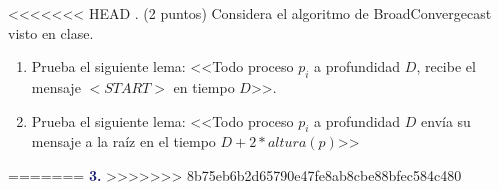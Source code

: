 <<<<<<< HEAD
. (2 puntos) Considera el algoritmo de BroadConvergecast visto en clase.

\begin{enumerate}
	\item Prueba el siguiente lema: <<Todo proceso $p_i$ a profundidad $D$, recibe el mensaje $<START>$ en tiempo $D$>>.
	
	\item Prueba el siguiente lema: <<Todo proceso $p_i$ a profundidad $D$ envía su mensaje a la raíz en el tiempo $D+2*altura(p)$>>
\end{enumerate}
=======
\newpage
\textbf{\textcolor{MidnightBlue}{3.}}
>>>>>>> 8b75eb6b2d65790e47fe8ab8cbe88bfec584c480
